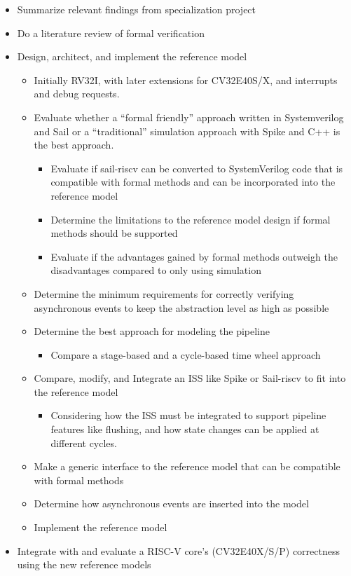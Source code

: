 \begin{itemize}
    \item Summarize relevant findings from specialization project
    \item Do a literature review of formal verification
    \item Design, architect, and implement the reference model
    \begin{itemize}
        \item Initially RV32I, with later extensions for CV32E40S/X, and interrupts and debug requests.
        \item Evaluate whether a “formal friendly” approach written in Systemverilog and Sail or a “traditional” simulation approach with Spike and C++ is the best approach.
        \begin{itemize}
            \item Evaluate if sail-riscv can be converted to SystemVerilog code that is compatible with formal methods and can be incorporated into the reference model
            \item Determine the limitations to the reference model design if formal methods should be supported
            \item Evaluate if the advantages gained by formal methods outweigh the disadvantages compared to only using simulation
        \end{itemize}
        \item Determine the minimum requirements for correctly verifying asynchronous events to keep the abstraction level as high as possible
        \item Determine the best approach for modeling the pipeline
        \begin{itemize}
            \item Compare a stage-based and a cycle-based time wheel approach
        \end{itemize}
        \item Compare, modify, and Integrate an ISS like Spike or Sail-riscv to fit into the reference model
        \begin{itemize}
            \item Considering how the ISS must be integrated to support pipeline features like flushing, and how state changes can be applied at different cycles.
        \end{itemize}
        \item Make a generic interface to the reference model that can be compatible with formal methods
        \item Determine how asynchronous events are inserted into the model
        \item Implement the reference model 
    \end{itemize}
    \item Integrate with and evaluate a RISC-V core’s (CV32E40X/S/P) correctness using the new reference models 

\end{itemize}


